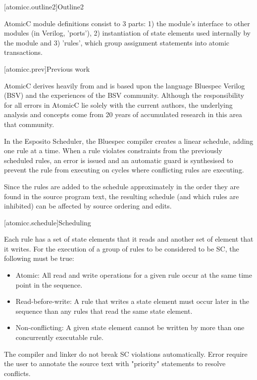 [atomicc.outline2]{Outline2}

AtomicC module definitions consist to 3 parts: 1) the module's interface to other
modules (in Verilog, 'ports'), 2) instantiation
of state elements used internally by the module and 3) 'rules', which group
assignment statements into atomic transactions.

[atomicc.prev]{Previous work}

AtomicC derives heavily from and is based upon the language Bluespec Verilog (BSV)
and the experiences of the BSV community.  Although the responsibility for all
errors in AtomicC lie solely with the current authors, the underlying analysis and
concepts come from 20 years of accumulated research in this area that community.

In the Esposito Scheduler\cite{Esposito:Patent},
the Bluespec compiler creates a linear schedule, adding
one rule at a time.  When a rule violates constraints from the previously scheduled
rules, an error is issued and an automatic guard is synthesised to prevent the
rule from executing on cycles where conflicting rules are executing.

Since the rules are added to the schedule approximately in the order they are
found in the source program text, the resulting schedule (and which rules are
inhibited) can be affected by source ordering and edits.


[atomicc.schedule]{Scheduling}

Each rule has a set of state elements that it reads and another set of element that it writes.
For the execution of a group of rules to be considered to be SC, the following must
be true:

\begin{itemize}
\item Atomic: All read and write operations for a given rule occur at the same time point in the sequence.
\item Read-before-write:  A rule that writes a state element must occur later in the sequence
than any rules that read the same state element.
\item Non-conflicting: A given state element cannot be written by more than one concurrently executable rule.
\end{itemize}

The compiler and linker do not break SC violations automatically. Error require the user to annotate
the source text with "priority" statements to resolve conflicts.

